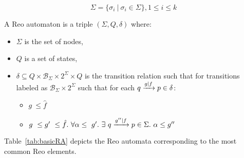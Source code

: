 $$\Sigma = \{\sigma_i\ |\ \sigma_i \in \Sigma\}, 1 \leq i \leq k$$ %
%
%
%
\begin{definition} 
 \label{def:ra}
 A Reo automaton %
is a triple $(\Sigma, Q, \delta)$ where:
\begin{itemize}
 \item $\Sigma$ is the set of nodes,
 \item $Q$ is a set of states,
 \item  $\delta \subseteq Q \times \mathcal{B}_{\Sigma} \times 2^{\Sigma} \times Q$ is the transition relation such that for transitions labeled as $\mathcal{B}_{\Sigma} \times 2^{\Sigma}$ such that for each $q\xrightarrow{g|f}p \in \delta$:
 \begin{itemize}
  \item $g\ \leq \hat{f}$\ \ \ \ \ \ \ \ \ \ \ \ \ \ \ \ \ \ \ \ \ \ \ \ \ \ \ \ \ \ \ \ \ \ \ \ \ \ \ \ \ \ \ \ \ \ \ \ \ \  %
  \item $g\ \leq g'\ \leq \hat{f}.\ \forall \alpha \leq \ g'.\ \exists \ \longtransition{q}{g''|f}{p} \in \Sigma .\ \alpha \leq g''$ %
 \end{itemize}
 \end{itemize}
\end{definition}

Table~\ref{tab:basicRA} depicts the Reo automata corresponding to the most common Reo elements.  

